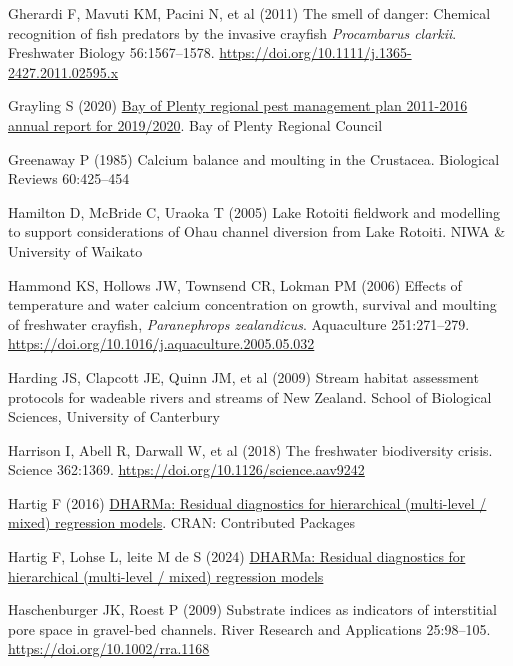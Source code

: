 \documentclass[
  12pt,
  a4paper,
  oneside]{scrbook}
\newlength{\cslhangindent}
\newenvironment{CSLReferences}[2] %
 {\begin{list}{}{%
  \setlength{\itemindent}{0pt}
  \setlength{\leftmargin}{0pt}
  \setlength{\parsep}{0pt}
  \ifodd #1
   \setlength{\leftmargin}{\cslhangindent}
   \setlength{\itemindent}{-1\cslhangindent}
  \fi
  \setlength{\itemsep}{#2\baselineskip}}}
 {\end{list}}
\begin{document}
\begin{CSLReferences}{1}{1}
Gherardi F, Mavuti KM, Pacini N, et al (2011) The smell of danger:
Chemical recognition of fish predators by the invasive crayfish
{\emph{Procambarus clarkii}}. Freshwater Biology 56:1567--1578.
\url{https://doi.org/10.1111/j.1365-2427.2011.02595.x}

Grayling S (2020)
\href{https://atlas.boprc.govt.nz/api/v1/edms/document/A3651696/content}{{Bay
of Plenty} regional pest management plan 2011-2016 annual report for
2019/2020}. Bay of Plenty Regional Council

Greenaway P (1985) Calcium balance and moulting in the {Crustacea}.
Biological Reviews 60:425--454

Hamilton D, McBride C, Uraoka T (2005) {Lake Rotoiti} fieldwork and
modelling to support considerations of {Ohau} channel diversion from
{Lake Rotoiti}. NIWA \& University of Waikato

Hammond KS, Hollows JW, Townsend CR, Lokman PM (2006) Effects of
temperature and water calcium concentration on growth, survival and
moulting of freshwater crayfish, {\emph{Paranephrops zealandicus}}.
Aquaculture 251:271--279.
\url{https://doi.org/10.1016/j.aquaculture.2005.05.032}

Harding JS, Clapcott JE, Quinn JM, et al (2009) Stream habitat
assessment protocols for wadeable rivers and streams of {New Zealand}.
School of Biological Sciences, University of Canterbury

Harrison I, Abell R, Darwall W, et al (2018) The freshwater biodiversity
crisis. Science 362:1369. \url{https://doi.org/10.1126/science.aav9242}

Hartig F (2016)
\href{https://doi.org/10.32614/cran.package.dharma}{{DHARMa}: Residual
diagnostics for hierarchical (multi-level / mixed) regression models}.
CRAN: Contributed Packages

{Hartig F, Lohse L, leite M de S} (2024)
\href{https://cran.r-project.org/web/packages/DHARMa/index.html}{DHARMa:
Residual diagnostics for hierarchical (multi-level / mixed) regression
models}

Haschenburger JK, Roest P (2009) Substrate indices as indicators of
interstitial pore space in gravel-bed channels. River Research and
Applications 25:98--105. \url{https://doi.org/10.1002/rra.1168}


\end{CSLReferences}
\end{document}
